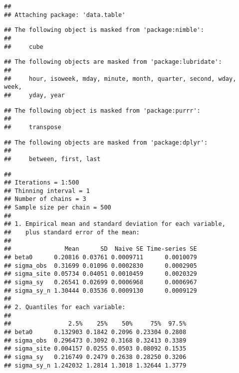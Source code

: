 \documentclass[
]{article}
\newenvironment{Shaded}{\begin{snugshade}}{\end{snugshade}}
\newcommand{\CommentTok}[1]{\textcolor[rgb]{0.56,0.35,0.01}{\textit{#1}}}
\newcommand{\FunctionTok}[1]{\textcolor[rgb]{0.13,0.29,0.53}{\textbf{#1}}}
\newcommand{\NormalTok}[1]{#1}
\newcommand{\SpecialCharTok}[1]{\textcolor[rgb]{0.81,0.36,0.00}{\textbf{#1}}}
\begin{document}
\begin{Shaded}
\end{Shaded}

\begin{verbatim}
## 
## Attaching package: 'data.table'
\end{verbatim}

\begin{verbatim}
## The following object is masked from 'package:nimble':
## 
##     cube
\end{verbatim}

\begin{verbatim}
## The following objects are masked from 'package:lubridate':
## 
##     hour, isoweek, mday, minute, month, quarter, second, wday, week,
##     yday, year
\end{verbatim}

\begin{verbatim}
## The following object is masked from 'package:purrr':
## 
##     transpose
\end{verbatim}

\begin{verbatim}
## The following objects are masked from 'package:dplyr':
## 
##     between, first, last
\end{verbatim}

\begin{Shaded}
\end{Shaded}

\begin{verbatim}
## 
## Iterations = 1:500
## Thinning interval = 1 
## Number of chains = 3 
## Sample size per chain = 500 
## 
## 1. Empirical mean and standard deviation for each variable,
##    plus standard error of the mean:
## 
##               Mean      SD  Naive SE Time-series SE
## beta0      0.20816 0.03761 0.0009711      0.0010079
## sigma_obs  0.31699 0.01096 0.0002830      0.0002905
## sigma_site 0.05734 0.04051 0.0010459      0.0020329
## sigma_sy   0.26541 0.02699 0.0006968      0.0006967
## sigma_sy_n 1.30444 0.03536 0.0009130      0.0009129
## 
## 2. Quantiles for each variable:
## 
##                2.5%    25%    50%     75%  97.5%
## beta0      0.132903 0.1842 0.2096 0.23304 0.2808
## sigma_obs  0.296473 0.3092 0.3168 0.32413 0.3389
## sigma_site 0.004157 0.0255 0.0503 0.08092 0.1535
## sigma_sy   0.216749 0.2479 0.2638 0.28250 0.3206
## sigma_sy_n 1.242032 1.2814 1.3018 1.32644 1.3779
\end{verbatim}
\end{document}
